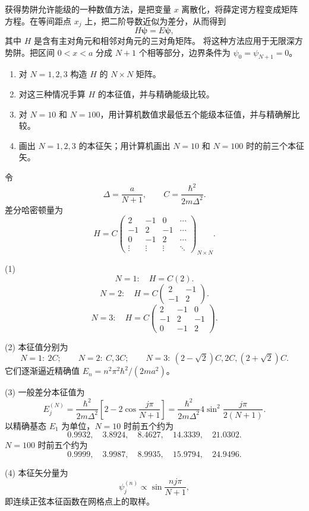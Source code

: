 \begin{question}
获得势阱允许能级的一种数值方法，是把变量 $x$ 离散化，将薛定谔方程变成矩阵方程。在等间距点 $x_j$ 上，把二阶导数近似为差分，从而得到
\[
H\mathbf{\psi}=E\mathbf{\psi},
\]
其中 $H$ 是含有主对角元和相邻对角元的三对角矩阵。
将这种方法应用于无限深方势阱。把区间 $0<x<a$ 分成 $N+1$ 个相等部分，边界条件为 $\psi_0=\psi_{N+1}=0$。
\begin{enumerate}
\item 对 $N=1,2,3$ 构造 $H$ 的 $N\times N$ 矩阵。
\item 对这三种情况手算 $H$ 的本征值，并与精确能级比较。
\item 对 $N=10$ 和 $N=100$，用计算机数值求最低五个能级本征值，并与精确解比较。
\item 画出 $N=1,2,3$ 的本征矢；用计算机画出 $N=10$ 和 $N=100$ 时的前三个本征矢。
\end{enumerate}
\end{question}
\begin{solution}
令
\[
\Delta=\frac{a}{N+1},
\qquad
C=\frac{\hbar^2}{2m\Delta^2}.
\]
差分哈密顿量为
\[
H=C\begin{pmatrix}
2&-1&0&\cdots\\
-1&2&-1&\cdots\\
0&-1&2&\cdots\\
\vdots&\vdots&\vdots&\ddots
\end{pmatrix}_{N\times N}.
\]

(1) 
\[
N=1:\quad H=C(2).
\]
\[
N=2:\quad H=C\begin{pmatrix}2&-1\\-1&2\end{pmatrix}.
\]
\[
N=3:\quad H=C\begin{pmatrix}2&-1&0\\-1&2&-1\\0&-1&2\end{pmatrix}.
\]

(2) 本征值分别为
\[
N=1:\ 2C;
\qquad
N=2:\ C,3C;
\qquad
N=3:\ (2-\sqrt2)C,2C,(2+\sqrt2)C.
\]
它们逐渐逼近精确值 $E_n=n^2\pi^2\hbar^2/(2ma^2)$。

(3) 一般差分本征值为
\[
E_j^{(N)}=\frac{\hbar^2}{2m\Delta^2}
\left[2-2\cos\frac{j\pi}{N+1}\right]
=\frac{\hbar^2}{2m\Delta^2}4\sin^2\frac{j\pi}{2(N+1)}.
\]
以精确基态 $E_1$ 为单位，$N=10$ 时前五个约为
\[
0.9932,
\quad 3.8924,
\quad 8.4627,
\quad 14.3339,
\quad 21.0302.
\]
$N=100$ 时前五个约为
\[
0.9999,
\quad 3.9987,
\quad 8.9935,
\quad 15.9794,
\quad 24.9496.
\]

(4) 本征矢分量为
\[
\psi_j^{(n)}\propto \sin\frac{nj\pi}{N+1},
\]
即连续正弦本征函数在网格点上的取样。
\end{solution}

